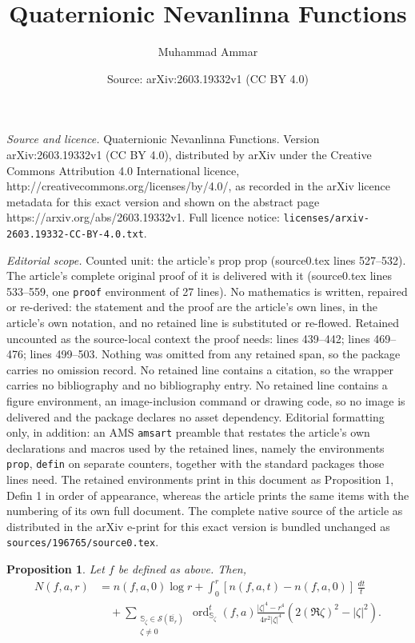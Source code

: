 \documentclass[10pt,a4paper]{amsart}
\title{Quaternionic Nevanlinna Functions}
\author{Muhammad Ammar}
\date{Source: arXiv:2603.19332v1 (CC BY 4.0)}
\newtheorem{prop}{Proposition}
\newcommand{\ordt}{\operatorname{ord}^t}
\newcommand{\s}{{\mathbb{S}}}
\begin{document}
\maketitle

\noindent\emph{Source and licence.} Quaternionic Nevanlinna Functions. Version arXiv:2603.19332v1 (CC BY 4.0), distributed by arXiv under the Creative Commons Attribution 4.0 International licence, http://creativecommons.org/licenses/by/4.0/, as recorded in the arXiv licence metadata for this exact version and shown on the abstract page https://arxiv.org/abs/2603.19332v1. Full licence notice: \texttt{licenses/arxiv-2603.19332-CC-BY-4.0.txt}.\par\smallskip

\noindent\textit{Editorial scope.} Counted unit: the article's prop prop (source0.tex lines 527--532). The article's complete original proof of it is delivered with it (source0.tex lines 533--559, one \texttt{proof} environment of 27 lines). No mathematics is written, repaired or re-derived: the statement and the proof are the article's own lines, in the article's own notation, and no retained line is substituted or re-flowed.  Retained uncounted as the source-local context the proof needs: lines 439--442; lines 469--476; lines 499--503.  Nothing was omitted from any retained span, so the package carries no omission record.  No retained line contains a citation, so the wrapper carries no bibliography and no bibliography entry.  No retained line contains a figure environment, an image-inclusion command or drawing code, so no image is delivered and the package declares no asset dependency.  Editorial formatting only, in addition: an AMS \texttt{amsart} preamble that restates the article's own declarations and macros used by the retained lines, namely the environments \texttt{prop}, \texttt{defin} on separate counters, together with the standard packages those lines need.  The retained environments print in this document as Proposition 1, Defin 1 in order of appearance, whereas the article prints the same items with the numbering of its own full document.  The complete native source of the article as distributed in the arXiv e-print for this exact version is bundled unchanged as \texttt{sources/196765/source0.tex}.
\begin{prop}\label{quatIntCou2}
    Let $f$ be defined as above. Then, \begin{align*}N(f,a,r)&=n(f,a,0)\log r + \int_0^r[n(f,a,t)-n(f,a,0)]
    \,\frac{dt}{t} \\&\quad+\sum_{\substack{ \s_\zeta\in\mathcal{S}(\overline{\mathbb B_r}) \\ \zeta\neq 0}}\ordt_{\s_\zeta}(f,a) \frac{|\zeta|^4-r^4}{4r^2|\zeta|^4}\left(2(\Re \zeta)^2-|\zeta|^2\right).\end{align*}
\end{prop}
\end{document}
